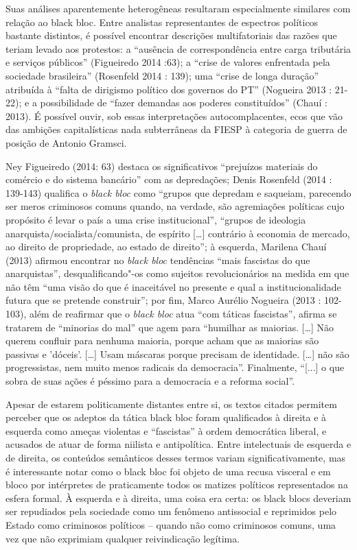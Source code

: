 Suas análises aparentemente heterogêneas resultaram especialmente
similares com relação ao black bloc. Entre analistas representantes de
espectros políticos bastante distintos, é possível encontrar descrições
multifatoriais das razões que teriam levado aos protestos: a ``ausência
de correspondência entre carga tributária e serviços públicos''
(Figueiredo 2014 :63); a ``crise de valores enfrentada pela sociedade
brasileira'' (Rosenfeld 2014 : 139); uma ``crise de longa duração''
atribuída à ``falta de dirigismo político dos governos do PT'' (Nogueira
2013 : 21-22); e a possibilidade de ``fazer demandas aos poderes
constituídos'' (Chauí : 2013). É possível ouvir, sob essas
interpretações autocomplacentes, ecos que vão das ambições
capitalísticas nada subterrâneas da FIESP à categoria de guerra de
posição de Antonio Gramsci.

Ney Figueiredo (2014: 63) destaca os significativos ``prejuízos
materiais do comércio e do sistema bancário'' com as depredações; Denis
Rosenfeld (2014 : 139-143) qualifica o \emph{black bloc} como ``grupos
que depredam e saqueiam, parecendo ser meros criminosos comuns quando,
na verdade, são agremiações políticas cujo propósito é levar o país a
uma crise institucional'', ``grupos de ideologia
anarquista/socialista/comunista, de espírito {[}\ldots{}{]} contrário à
economia de mercado, ao direito de propriedade, ao estado de direito'';
à esquerda, Marilena Chauí (2013) afirmou encontrar no \emph{black bloc}
tendências ``mais fascistas do que anarquistas'', desqualificando"-os
como sujeitos revolucionários na medida em que não têm ``uma visão do
que é inaceitável no presente e qual a institucionalidade futura que se
pretende construir''; por fim, Marco Aurélio Nogueira (2013 : 102-103),
além de reafirmar que o \emph{black bloc} atua ``com táticas
fascistas'', afirma se tratarem de ``minorias do mal'' que agem para
``humilhar as maiorias. {[}\ldots{}{]} Não querem confluir para nenhuma
maioria, porque acham que as maiorias são passivas e 'dóceis'.
{[}\ldots{}{]} Usam máscaras porque precisam de identidade.
{[}\ldots{}{]} não são progressistas, nem muito menos radicais da
democracia''. Finalmente, ``{[}...{]} o que sobra de suas ações é
péssimo para a democracia e a reforma social''.

Apesar de estarem politicamente distantes entre si, os textos citados
permitem perceber que os adeptos da tática black bloc foram qualificados
à direita e à esquerda como ameças violentas e ``fascistas'' à ordem
democrática liberal, e acusados de atuar de forma niilista e
antipolítica. Entre intelectuais de esquerda e de direita, os conteúdos
semânticos desses termos variam significativamente, mas é interessante
notar como o black bloc foi objeto de uma recusa visceral e em bloco por
intérpretes de praticamente todos os matizes políticos representados na
esfera formal. À esquerda e à direita, uma coisa era certa: os black
blocs deveriam ser repudiados pela sociedade como um fenômeno
antissocial e reprimidos pelo Estado como criminosos políticos -- quando
não como criminosos comuns, uma vez que não exprimiam qualquer
reivindicação legítima.

